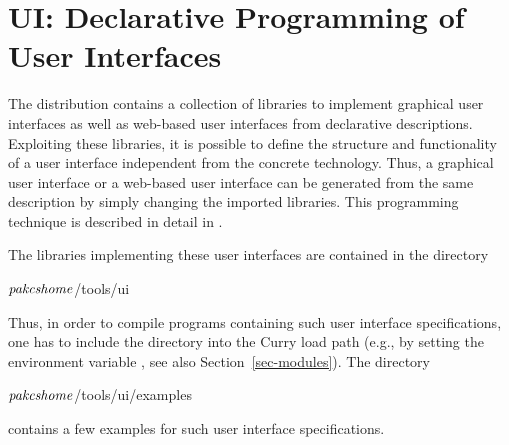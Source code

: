 \section{UI: Declarative Programming of User Interfaces}
\label{sec-ui}

The \CYS distribution contains a collection of libraries
to implement graphical user interfaces
as well as web-based user interfaces
from declarative descriptions.
Exploiting these libraries, it is possible
to define the structure and functionality of a user interface
independent from the concrete technology.
Thus, a graphical user interface or a web-based user interface
can be generated from the same description by simply changing
the imported libraries.
This programming technique is described in detail in
\cite{HanusKluss09PADL}.

The libraries implementing these user interfaces are contained
in the directory
\begin{curry}
$\mbox{\textit{pakcshome}}$/tools/ui
\end{curry}
Thus, in order to compile programs containing such user interface
specifications, one has to
include the directory 
into the Curry load path
(e.g., by setting  the environment variable
, see also Section~\ref{sec-modules}).
The directory
\begin{curry}
$\mbox{\textit{pakcshome}}$/tools/ui/examples
\end{curry}
contains a few examples for such user interface specifications.

